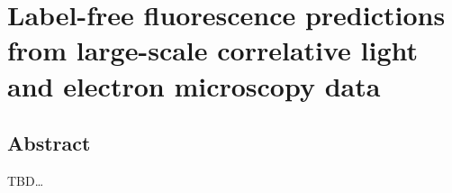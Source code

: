 \chapter{Label-free fluorescence predictions from large-scale correlative light and electron microscopy data}
\label{chap:4}
\begin{refsection}

\section*{Abstract}
\begin{small}
    TBD\ldots
\end{small}

% 
% 
% 


\printbibliography[title={References}]
\end{refsection}
